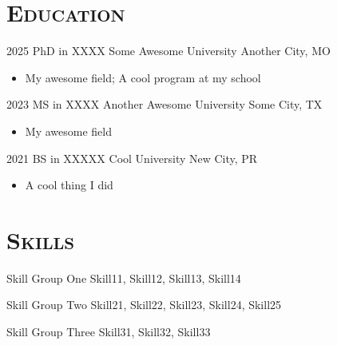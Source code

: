 \documentclass[letterpaper,11pt,twoside]{evo_cv}
\begin{document}

\section{\textsc{Education}}
  \cveducation
    {2025}
    {PhD in XXXX}
    {Some Awesome University}
    {Another City, MO}
    {
      {
        \begin{itemize}[leftmargin=0.6cm, label={}, before=\vspace{-1pt}, after=\vspace{3pt}]
	  \item {\sffamily{}} My awesome field; {\sffamily{}} A cool program at my school
        \end{itemize}
      }
    }

  \cveducation
    {2023}
    {MS in XXXX}
    {Another Awesome University}
    {Some City, TX}
    {
      {
        \begin{itemize}[leftmargin=0.6cm, label={}, before=\vspace{-1pt}, after=\vspace{3pt}]
	  \item {\sffamily{}} My awesome field
        \end{itemize}
      }
    }

  \cveducation
    {2021}
    {BS in XXXXX}
    {Cool University}
    {New City, PR}
    {
      {
        \begin{itemize}[leftmargin=0.6cm, label={}, before=\vspace{-1pt}, after=\vspace{3pt}]
	  \item {\sffamily{}} A cool thing I did
        \end{itemize}
      }
    }


\section{\textsc{Skills}}
  \cvskilllist
    {Skill Group One}
    {Skill11, Skill12, Skill13, Skill14}

  \cvskilllist
    {Skill Group Two}
    {Skill21, Skill22, Skill23, Skill24, Skill25}
    
  \cvskilllist
    {Skill Group Three}
    {Skill31, Skill32, Skill33}
\end{document}
